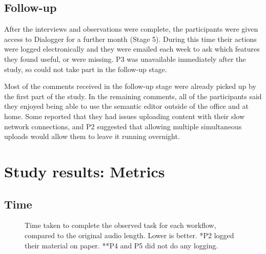 
\subsection{Follow-up}\label{sec:followup}
After the interviews and observations were complete, the participants were given
access to Dialogger for a further month (Stage 5). During this time their
actions were logged electronically and they were emailed each week to ask which
features they found useful, or were missing. P3 was unavailable immediately
after the study, so could not take part in the follow-up stage.

Most of the comments received in the follow-up stage were already picked up by
the first part of the study. In the remaining comments, all of the participants
said they enjoyed being able to use the semantic editor outside of the office
and at home. Some reported that they had issues uploading content with their
slow network connections, and P2 suggested that allowing multiple simultaneous
uploads would allow them to leave it running overnight.


\section{Study results: Metrics}\label{sec:resultsmetrics}
\subsection{Time}

\begin{figure}
\centering
	\caption{Time taken to complete the observed task for each workflow, compared
    to the original audio length. Lower is better. *P2 logged their material on
    paper. **P4 and P5 did not do any logging.}
  \label{fig:time}
\end{figure}

